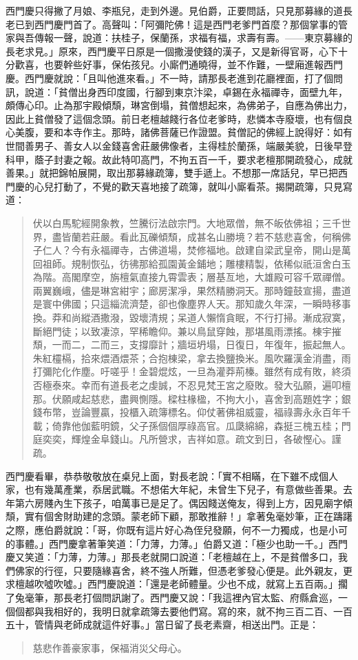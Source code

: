 西門慶只得撇了月娘、李瓶兒，走到外邊。見伯爵，正要問話，只見那募緣的道長老已到西門慶門首了。高聲叫：「阿彌陀佛！這是西門老爹門首麼？那個掌事的管家與吾傳報一聲，說道：扶桂子，保蘭孫，求福有福，求壽有壽。——東京募緣的長老求見。」原來，西門慶平日原是一個撒漫使錢的漢子，又是新得官哥，心下十分歡喜，也要幹些好事，保佑孩兒。小廝們通曉得，並不作難，一壁廂進報西門慶。西門慶就說：「且叫他進來看。」不一時，請那長老進到花廳裡面，打了個問訊，說道：「貧僧出身西印度國，行腳到東京汴梁，卓錫在永福禪寺，面壁九年，頗傳心印。止為那宇殿傾頹，琳宮倒塌，貧僧想起來，為佛弟子，自應為佛出力，因此上貧僧發了這個念頭。前日老檀越餞行各位老爹時，悲憐本寺廢壞，也有個良心美腹，要和本寺作主。那時，諸佛菩薩已作證盟。貧僧記的佛經上說得好：如有世間善男子、善女人以金錢喜舍莊嚴佛像者，主得桂於蘭孫，端嚴美貌，日後早登科甲，蔭子封妻之報。故此特叩高門，不拘五百一千，要求老檀那開疏發心，成就善果。」就把錦帕展開，取出那募緣疏簿，雙手遞上。不想那一席話兒，早已把西門慶的心兒打動了，不覺的歡天喜地接了疏簿，就叫小廝看茶。揭開疏簿，只見寫道：
\begin{quote}
伏以白馬駝經開象教，竺騰衍法啟宗門。大地眾僧，無不皈依佛祖；三千世界，盡皆蘭若莊嚴。看此瓦礫傾頹，成甚名山勝境？若不慈悲喜舍，何稱佛子仁人？今有永福禪寺，古佛道場，焚修福地。啟建自梁武皇帝，開山是萬回祖師。規制恢弘，彷彿那給孤園黃金鋪地；雕樓精製，依稀似祇洹舍白玉為階。高閣摩空，旃檀氣直接九霄雲表；層基亙地，大雄殿可容千眾禪僧。兩翼巍峨，儘是琳宮紺宇；廊房潔凈，果然精勝洞天。那時鐘鼓宣揚，盡道是寰中佛國；只這緇流濟楚，卻也像塵界人天。那知歲久年深，一瞬時移事換。莽和尚縱酒撒潑，毀壞清規；呆道人懶惰貪眠，不行打掃。漸成寂寞，斷絕門徒；以致凄涼，罕稀瞻仰。兼以鳥鼠穿蝕，那堪風雨漂搖。棟宇摧頹，一而二，二而三，支撐靡計；牆垣坍塌，日復日，年復年，振起無人。朱紅欞槅，拾來煨酒煨茶；合抱棟梁，拿去換鹽換米。風吹羅漢金消盡，雨打彌陀化作塵。吁嗟乎！金碧焜炫，一旦為灌莽荊榛。雖然有成有敗，終須否極泰來。幸而有道長老之虔誠，不忍見梵王宮之廢敗。發大弘願，遍叩檀那。伏願咸起慈悲，盡興惻隱。樑柱椽楹，不拘大小，喜舍到高題姓字；銀錢布幣，豈論豐贏，投櫃入疏簿標名。仰仗著佛祖威靈，福祿壽永永百年千載；倚靠他伽藍明鏡，父子孫個個厚祿高官。瓜瓞綿綿，森挺三槐五桂；門庭奕奕，輝煌金阜錢山。凡所營求，吉祥如意。疏文到日，各破慳心。謹疏。
\end{quote}

西門慶看畢，恭恭敬敬放在桌兒上面，對長老說：「實不相瞞，在下雖不成個人家，也有幾萬產業，忝居武職。不想偌大年紀，未曾生下兒子，有意做些善果。去年第六房賤內生下孩子，咱萬事已是足了。偶因餞送俺友，得到上方，因見廟字傾頹，實有個舍財助建的念頭。蒙老師下顧，那敢推辭！」拿著兔毫妙筆，正在躊躇之際，應伯爵就說：「哥，你既有這片好心為侄兒發願，何不一力獨成，也是小可的事體。」西門慶拿著筆笑道：「力薄，力薄。」伯爵又道：「極少也助一千。」西門慶又笑道：「力薄，力薄。」那長老就開口說道：「老檀越在上，不是貧僧多口，我們佛家的行徑，只要隨緣喜舍，終不強人所難，但憑老爹發心便是。此外親友，更求檀越吹噓吹噓。」西門慶說道：「還是老師體量。少也不成，就寫上五百兩。」擱了兔毫筆，那長老打個問訊謝了。西門慶又說：「我這裡內官太監、府縣倉巡，一個個都與我相好的，我明日就拿疏簿去要他們寫。寫的來，就不拘三百二百、一百五十，管情與老師成就這件好事。」當日留了長老素齋，相送出門。正是：
\begin{quote}
慈悲作善豪家事，保福消災父母心。
\end{quote}

